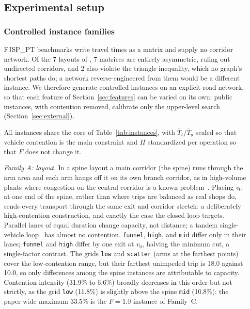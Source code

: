 \documentclass[preprint,review,12pt,authoryear]{elsarticle}
\newcommand{\ContentionLo}{6.6\%}
\newcommand{\ContentionHi}{33.5\%}
\newcommand{\ContentionAHi}{31.9\%}
\newcommand{\ContentionALow}{11.8\%}
\newcommand{\ContentionAMid}{10.8\%}
\newcommand{\LegDumbbell}{10.0}          %
\newcommand{\LegGrid}{18.0}              %
\newcommand{\PubNLayout}{7}
\newcommand{\PubNLayoutAsym}{7}           %
\newcommand{\PubNLayoutBad}{2}            %
\begin{document}
\subsection{Experimental setup}
\label{sec:instances}

\subsubsection{Controlled instance families}
FJSP\_PT benchmarks write travel times as a matrix and supply no corridor network.
Of the \PubNLayout{} layouts of \citet{homayouni2021production}, \PubNLayoutAsym{} matrices are entirely asymmetric, ruling out undirected corridors, and \PubNLayoutBad{} also violate the triangle inequality, which no graph's shortest paths do; a network reverse-engineered from them would be a different instance.
We therefore generate controlled instances on an explicit road network, so that each feature of Section~\ref{sec:features} can be varied on its own; public instances, with contention removed, calibrate only the upper-level search (Section~\ref{sec:external}).

All instances share the core of Table~\ref{tab:instances}, with $\bar{T}_t/\bar{T}_p$ scaled so that vehicle contention is the main constraint and $H$ standardized per operation so that $F$ does not change it.

\emph{Family A: layout.}
In a spine layout a main corridor (the spine) runs through the arm area and each arm hangs off it on its own branch corridor, as in high-volume plants where congestion on the central corridor is a known problem~\citep{suh2022spine}.
Placing $v_0$ at one end of the spine, rather than where trips are balanced as real shops do, sends every transport through the same exit and corridor stretch: a deliberately high-contention construction, and exactly the case the closed loop targets.
Parallel lanes of equal duration change capacity, not distance; a tandem single-vehicle loop~\citep{rahimikelarijani2020tandem} has almost no contention.
\texttt{funnel}, \texttt{high}, and \texttt{mid} differ only in their lanes; \texttt{funnel} and \texttt{high} differ by one exit at $v_0$, halving the minimum cut, a single-factor contrast.
The grids \texttt{low} and \texttt{scatter} (arms at the farthest points) cover the low-contention range, but their farthest unimpeded trip is \LegGrid{} against \LegDumbbell{}, so only differences among the spine instances are attributable to capacity.
Contention intensity (\ContentionAHi{} to \ContentionLo{}) broadly decreases in this order but not strictly, as the grid \texttt{low} (\ContentionALow{}) is slightly above the spine \texttt{mid} (\ContentionAMid{}); the paper-wide maximum \ContentionHi{} is the $F=1.0$ instance of Family~C.
\end{document}
